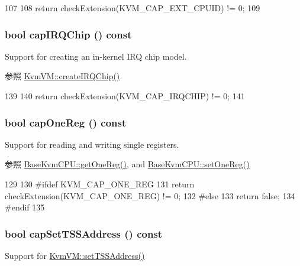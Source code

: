 \begin{DoxyCode}
107 {
108     return checkExtension(KVM_CAP_EXT_CPUID) != 0;
109 }
\end{DoxyCode}
\hypertarget{classKvm_ab3e6d2bb7ea83c6cdc20369bf3a274a6}{
\subsubsection[{capIRQChip}]{\setlength{\rightskip}{0pt plus 5cm}bool capIRQChip () const}}
\label{classKvm_ab3e6d2bb7ea83c6cdc20369bf3a274a6}
Support for creating an in-\/kernel IRQ chip model.

\begin{DoxySeeAlso}{参照}
\hyperlink{group__KvmInterrupts_ga75f1140369bf3942bb93a75d1b3de2c9}{KvmVM::createIRQChip()} 
\end{DoxySeeAlso}



\begin{DoxyCode}
139 {
140     return checkExtension(KVM_CAP_IRQCHIP) != 0;
141 }
\end{DoxyCode}
\hypertarget{classKvm_af1ad3b73711f45008bcb240d012987f7}{
\subsubsection[{capOneReg}]{\setlength{\rightskip}{0pt plus 5cm}bool capOneReg () const}}
\label{classKvm_af1ad3b73711f45008bcb240d012987f7}
Support for reading and writing single registers.

\begin{DoxySeeAlso}{参照}
\hyperlink{classBaseKvmCPU_ab5a47c64ebf5a4de2539c6f71f7acc51}{BaseKvmCPU::getOneReg()}, and \hyperlink{classBaseKvmCPU_ad96695f9596f808056054f3c2026b818}{BaseKvmCPU::setOneReg()} 
\end{DoxySeeAlso}



\begin{DoxyCode}
129 {
130 #ifdef KVM_CAP_ONE_REG
131     return checkExtension(KVM_CAP_ONE_REG) != 0;
132 #else
133     return false;
134 #endif
135 }
\end{DoxyCode}
\hypertarget{classKvm_a8bc7fe4f8395a54ef945822211a57228}{
\subsubsection[{capSetTSSAddress}]{\setlength{\rightskip}{0pt plus 5cm}bool capSetTSSAddress () const}}
\label{classKvm_a8bc7fe4f8395a54ef945822211a57228}
Support for \hyperlink{classKvmVM_a04e3bed0038549a704fe5c04015ce46d}{KvmVM::setTSSAddress()} 


